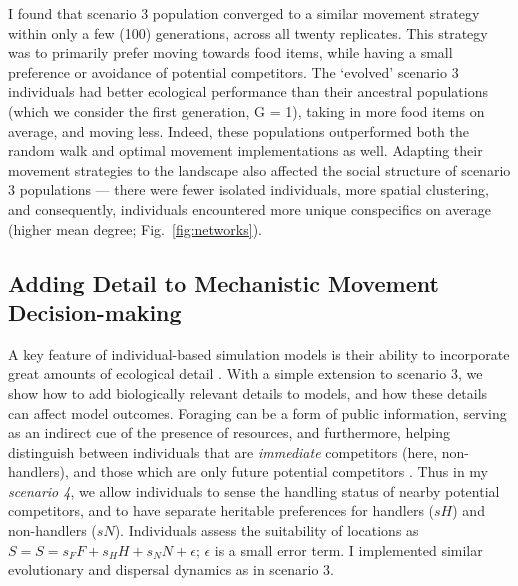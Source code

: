 I found that scenario 3 population converged to a similar movement strategy within only a few (100) generations, across all twenty replicates.
This strategy was to primarily prefer moving towards food items, while having a small preference or avoidance of potential competitors.
The `evolved' scenario 3 individuals had better ecological performance than their ancestral populations (which we consider the first generation, G = 1), taking in more food items on average, and moving less.
Indeed, these populations outperformed both the random walk and optimal movement implementations as well.
Adapting their movement strategies to the landscape also affected the social structure of scenario 3 populations --- there were fewer isolated individuals, more spatial clustering, and consequently, individuals encountered more unique conspecifics on average (higher mean degree; Fig.~\ref{fig:networks}).

\subsection*{Adding Detail to Mechanistic Movement Decision-making}

A key feature of individual-based simulation models is their ability to incorporate great amounts of ecological detail \citep{deangelis2019}.
With a simple extension to scenario 3, we show how to add biologically relevant details to models, and how these details can affect model outcomes.
Foraging can be a form of public information, serving as an indirect cue of the presence of resources, and furthermore, helping distinguish between individuals that are \textit{immediate} competitors (here, non-handlers), and those which are only future potential competitors \citep[][; here, handlers]{dall2005,giraldeau2018,beauchamp2008,beauchamp2013}.
Thus in my \textit{scenario 4}, we allow individuals to sense the handling status of nearby potential competitors, and to have separate heritable preferences for handlers ($sH$) and non-handlers ($sN$).
Individuals assess the suitability of locations as $S = S = s_FF + s_HH + s_NN + \epsilon$; $\epsilon$ is a small error term.
I implemented similar evolutionary and dispersal dynamics as in scenario 3.

